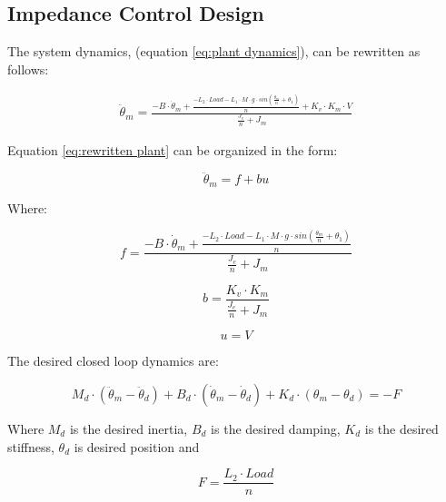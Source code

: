 \subsection{Impedance Control Design}

The system dynamics, (equation \ref{eq:plant dynamics}), can be rewritten as follows:


\begin{equation}
\begin{split}
\label{eq:rewritten plant}
\ddot{\theta}_m = \frac{-B \cdot \dot{\theta}_m + \frac{-L_2 \cdot Load - L_1 \cdot M \cdot g \cdot sin (\frac{\theta_m}{n}+\theta_1 )}{n} + K_v \cdot K_m \cdot V }{\frac{J_e}{n}+J_m}
\end{split}
\end{equation}

Equation \ref{eq:rewritten plant} can be organized in the form:

\begin{equation}
\label{eq:reorg}
\ddot{\theta}_m = f + bu
\end{equation}

Where:

\begin{equation}
\label{eq:f}
f = \frac{-B \cdot \dot{\theta}_m + \frac{-L_2 \cdot Load - L_1 \cdot M \cdot g \cdot sin \left(\frac{\theta_m}{n}+\theta_1 \right)}{n}}{\frac{J_e}{n}+J_m}
\end{equation}

\begin{equation}
\label{eq:b}
b = \frac{K_v \cdot K_m}{\frac{J_e}{n}+J_m}
\end{equation}

\begin{equation}
\label{eq:u}
u = V
\end{equation}

The desired closed loop dynamics are:

\begin{equation}
\label{eq:desired}
M_d \cdot (\ddot{\theta}_m-\ddot{\theta}_d) + B_d \cdot (\dot{\theta}_m - \dot{\theta}_d) + K_d \cdot (\theta_m - \theta_d) = -F
\end{equation}

Where \(M_d\) is the desired inertia, \(B_d\) is the desired damping, \(K_d\) is the desired stiffness, \(\theta_d\) is desired position and 

\begin{equation}
\label{eq:F}
F = \frac{L_2 \cdot Load}{n}
\end{equation}

